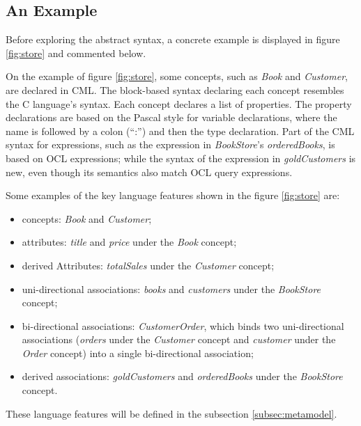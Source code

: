 \subsection{An Example}\label{subsec:example}

Before exploring the abstract syntax, a concrete example is displayed in figure \ref{fig:store} and commented below.



On the example of figure \ref{fig:store}, some concepts, such as \emph{Book} and \emph{Customer}, are declared in CML. 
The block-based syntax declaring each concept resembles the C \cite{clang} language's syntax. 
Each concept declares a list of properties.
The property declarations are based on the Pascal \cite{pascal} style for variable declarations,
where the name is followed by a colon (``:'') and then the type declaration.
Part of the CML syntax for expressions, such as the expression in \emph{BookStore}'s \emph{orderedBooks}, is based on OCL \cite{ocl} expressions; while the syntax of the expression in \emph{goldCustomers} is new, even though its semantics also match OCL \cite{ocl} query expressions.

Some examples of the key language features shown in the figure \ref{fig:store} are:
\begin{itemize}
\item concepts: \emph{Book} and \emph{Customer};
\item attributes: \emph{title} and \emph{price} under the \emph{Book} concept;  
\item derived Attributes: \emph{totalSales} under the \emph{Customer} concept;
\item uni-directional associations: \emph{books} and \emph{customers} under the \emph{BookStore} concept;
\item bi-directional associations: \emph{CustomerOrder},
which binds two uni-directional associations (\emph{orders} under the \emph{Customer} concept and \emph{customer} under the \emph{Order} concept) into a single bi-directional association;
\item derived associations: \emph{goldCustomers} and \emph{orderedBooks} under the \emph{BookStore} concept.
\end{itemize}

These language features will be defined in the subsection \ref{subsec:metamodel}.